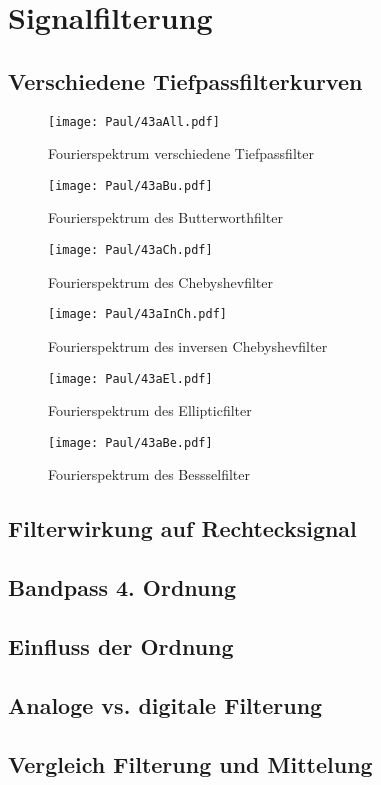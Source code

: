 \section{Signalfilterung}

\subsection{Verschiedene Tiefpassfilterkurven}
\begin{figure}[h]
    \centering
    \texttt{[image: Paul/43aAll.pdf]}
    \caption{Fourierspektrum verschiedene Tiefpassfilter}
\end{figure}

\begin{figure}[h]
    \centering
    \texttt{[image: Paul/43aBu.pdf]}
    \caption{Fourierspektrum des Butterworthfilter}
\end{figure}

\begin{figure}[h]
    \centering
    \texttt{[image: Paul/43aCh.pdf]}
    \caption{Fourierspektrum des Chebyshevfilter}
\end{figure}

\begin{figure}[h]
    \centering
    \texttt{[image: Paul/43aInCh.pdf]}
    \caption{Fourierspektrum des inversen Chebyshevfilter}
\end{figure}

\begin{figure}[h]
    \centering
    \texttt{[image: Paul/43aEl.pdf]}
    \caption{Fourierspektrum des Ellipticfilter}
\end{figure}

\begin{figure}[h]
    \centering
    \texttt{[image: Paul/43aBe.pdf]}
    \caption{Fourierspektrum des Bessselfilter}
\end{figure}


\subsection{Filterwirkung auf Rechtecksignal}



\subsection{Bandpass 4. Ordnung}


\subsection{Einfluss der Ordnung}


\subsection{Analoge vs. digitale Filterung}


\subsection{Vergleich Filterung und Mittelung}